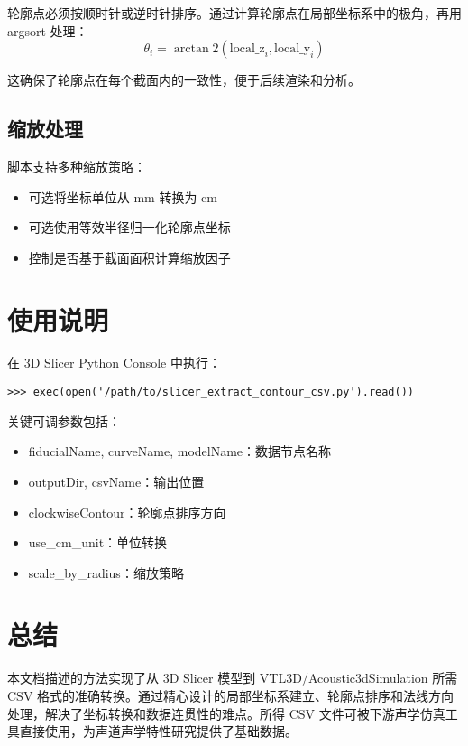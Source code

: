 \documentclass[12pt,a4paper]{article}
\begin{document}
轮廓点必须按顺时针或逆时针排序。通过计算轮廓点在局部坐标系中的极角，再用 argsort 处理：
\begin{equation}
\theta_i = \arctan2(\text{local\_z}_i, \text{local\_y}_i)
\end{equation}

这确保了轮廓点在每个截面内的一致性，便于后续渲染和分析。

\subsection{缩放处理}

脚本支持多种缩放策略：
\begin{itemize}
  \item 可选将坐标单位从 mm 转换为 cm
  \item 可选使用等效半径归一化轮廓点坐标
  \item 控制是否基于截面面积计算缩放因子
\end{itemize}

\section{使用说明}

在 3D Slicer Python Console 中执行：
\begin{verbatim}
>>> exec(open('/path/to/slicer_extract_contour_csv.py').read())
\end{verbatim}

关键可调参数包括：
\begin{itemize}
  \item fiducialName, curveName, modelName：数据节点名称
  \item outputDir, csvName：输出位置
  \item clockwiseContour：轮廓点排序方向
  \item use\_cm\_unit：单位转换
  \item scale\_by\_radius：缩放策略
\end{itemize}

\section{总结}

本文档描述的方法实现了从 3D Slicer 模型到 VTL3D/Acoustic3dSimulation 所需 CSV 格式的准确转换。通过精心设计的局部坐标系建立、轮廓点排序和法线方向处理，解决了坐标转换和数据连贯性的难点。所得 CSV 文件可被下游声学仿真工具直接使用，为声道声学特性研究提供了基础数据。
\end{document}
